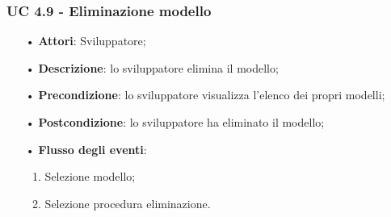\subsubsection{UC 4.9 - Eliminazione modello}
\begin{itemize}
	\item[•]\textbf{Attori}: Sviluppatore;
	\item[•]\textbf{Descrizione}: lo sviluppatore elimina il modello;
	\item[•]\textbf{Precondizione}: lo sviluppatore visualizza l'elenco dei propri modelli;
	\item[•]\textbf{Postcondizione}: lo sviluppatore ha eliminato il modello; 
	\item[•]\textbf{Flusso degli eventi}: 
	\begin{enumerate}
		\item Selezione modello;
		\item Selezione procedura eliminazione.
	\end{enumerate}   
\end{itemize}